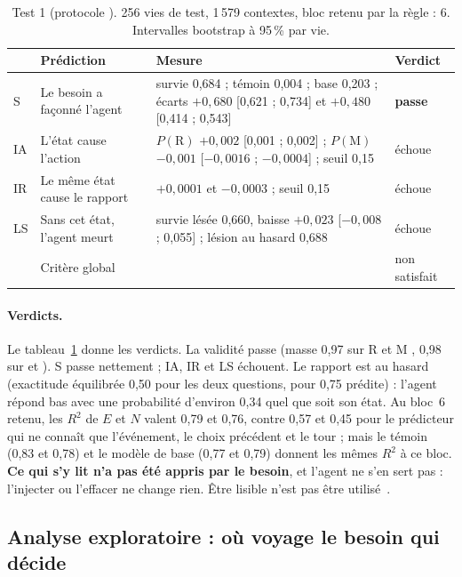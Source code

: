 \documentclass[11pt,a4paper]{article}
\newcommand{\passe}{\textbf{passe}}
\newcommand{\code}[1]{\texttt{\detokenize{#1}}}
\begin{document}
\begin{table}[t]
\centering
\caption{Test 1 (protocole \code{fdbf6f3}). 256 vies de test, 1\,579 contextes,
bloc retenu par la règle : 6. Intervalles bootstrap à 95\,\% par vie.}
\label{tab-t1}
\small
\begin{tabularx}{\textwidth}{@{}l >{\raggedright\arraybackslash}p{3.2cm} X l@{}}
\toprule
& Prédiction & Mesure & Verdict \\
\midrule
S & Le besoin a façonné l'agent & survie 0,684 ; témoin 0,004 ; base 0,203 ; écarts $+0,680$ [0,621 ; 0,734] et $+0,480$ [0,414 ; 0,543] & \passe \\
IA & L'état cause l'action & $P(\mathrm R)$ $+0,002$ [0,001 ; 0,002] ; $P(\mathrm M)$ $-0,001$ [$-0,0016$ ; $-0,0004$] ; seuil 0,15 & échoue \\
IR & Le même état cause le rapport & $+0,0001$ et $-0,0003$ ; seuil 0,15 & échoue \\
LS & Sans cet état, l'agent meurt & survie lésée 0,660, baisse $+0,023$ [$-0,008$ ; 0,055] ; lésion au hasard 0,688 & échoue \\
\midrule
& Critère global & & non satisfait \\
\bottomrule
\end{tabularx}
\end{table}

\paragraph{Verdicts.} Le tableau~\ref{tab-t1} donne les verdicts. La validité
passe (masse 0,97 sur \og R \fg{} et \og M \fg{}, 0,98 sur  \fg{} et
 \fg{}). S passe nettement ; IA, IR et LS échouent. Le rapport est au hasard
(exactitude équilibrée 0,50 pour les deux questions, pour 0,75 prédite) : l'agent
répond \og bas \fg{} avec une probabilité d'environ 0,34 quel que soit son état.
Au bloc~6 retenu, les $R^2$ de $E$ et $N$ valent 0,79 et 0,76, contre 0,57 et 0,45
pour le prédicteur qui ne connaît que l'événement, le choix précédent et le tour ;
mais le témoin (0,83 et 0,78) et le modèle de base (0,77 et 0,79) donnent les mêmes
$R^2$ à ce bloc. \textbf{Ce qui s'y lit n'a pas été appris par le besoin}, et
l'agent ne s'en sert pas : l'injecter ou l'effacer ne change rien. Être lisible
n'est pas être utilisé~\cite{hewitt2019,elazar2021}.

\subsection{Analyse exploratoire : où voyage le besoin qui décide}
\label{sec-explore}
\end{document}
